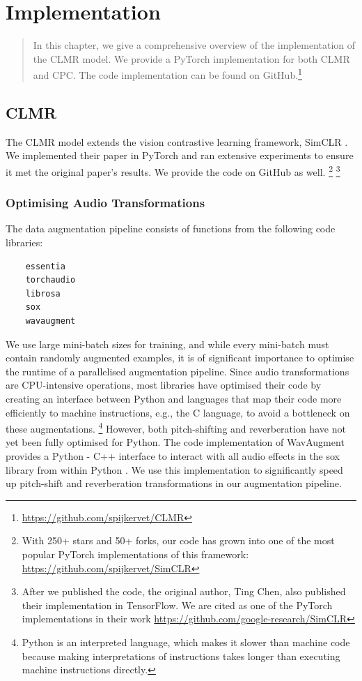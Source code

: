 \chapter{Implementation}
\begin{quote}
    In this chapter, we give a comprehensive overview of the implementation of the CLMR model. We provide a PyTorch \cite{pytorch2019} implementation for both CLMR and CPC. The code implementation can be found on GitHub.\footnote{\url{https://github.com/spijkervet/CLMR}}
\end{quote}


\section{CLMR}
The CLMR model extends the vision contrastive learning framework, SimCLR \cite{chen_simple_2020}. We implemented their paper in PyTorch and ran extensive experiments to ensure it met the original paper's results.
We provide the code on GitHub as well.
\footnote{With 250+ stars and 50+ forks, our code has grown into one of the most popular PyTorch implementations of this framework: \url{https://github.com/spijkervet/SimCLR}}
\footnote{After we published the code, the original author, Ting Chen, also published their implementation in TensorFlow. We are cited as one of the PyTorch implementations in their work \url{https://github.com/google-research/SimCLR}}

\subsection{Optimising Audio Transformations}
The data augmentation pipeline consists of functions from the following code libraries:
\begin{verbatim}
    essentia
    torchaudio
    librosa
    sox
    wavaugment
\end{verbatim}
We use large mini-batch sizes for training, and while every mini-batch must contain randomly augmented examples, it is of significant importance to optimise the runtime of a parallelised augmentation pipeline.
Since audio transformations are CPU-intensive operations, most libraries have optimised their code by creating an interface between Python and languages that map their code more efficiently to machine instructions, e.g., the C language, to avoid a bottleneck on these augmentations.
\footnote{Python is an interpreted language, which makes it slower than machine code because making interpretations of instructions takes longer than executing machine instructions directly.}
However, both pitch-shifting and reverberation have not yet been fully optimised for Python. The code implementation of WavAugment provides a Python - C++ interface to interact with all audio effects in the sox library from within Python \cite{wavaugment2020}.
We use this implementation to significantly speed up pitch-shift and reverberation transformations in our augmentation pipeline.

